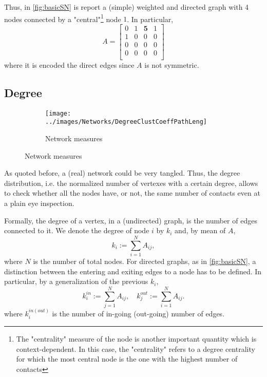 \documentclass[a4paper,10pt,twoside]{book} %
\theoremstyle{definition}
\begin{document}
Thus, in \autoref{fig:basicSN} is report a (simple) weighted and directed graph with 4 nodes connected by a "central"\footnote{The "centrality" measure of the node is another important quantity which is context-dependent. In this case, the "centrality" refers to a degree centrality for which the most central node is the one with the highest number of contacts} node $1$.
In particular,
\[
A = 
\begin{bmatrix}
0 & 1 & \textbf{5} & 1 \\
1 & 0 & 0 & 0 \\
0 & 0 & 0 & 0 \\
0 & 0 & 0 & 0 \\ 
\end{bmatrix}
\]
where it is encoded the direct edges since $A$ is not symmetric.

\subsection{Degree}

\begin{figure}[ht]
    \begin{subfigure}{\textwidth}
        \texttt{[image: ../images/Networks/DegreeClustCoeffPathLeng]}
        \centering
        \caption{Network measures \cite{Olaf:2011_NonRandomBrain}}
        \label{fig:degree_clustcoefficient_pathlength}
    \end{subfigure}
\end{figure}


As quoted before, a (real) network could be very tangled. Thus, the degree distribution, i.e. the normalized number of vertexes with a certain degree, allows to check whether all the nodes have, or not, the same number of contacts even at a plain eye inspection. 

Formally, the degree of a vertex, in a (undirected) graph, is the number of edges connected to it. We denote the degree of node $i$ by $k_i$ and, by mean of $A$, $$k_i := \sum_{i=1}^{N} A_{ij},$$ where $N$ is the number of total nodes.
For directed graphs, as in \autoref{fig:basicSN}, a distinction between the entering and exiting edges to a node has to be defined. In particular, by a generalization of the previous $k_i$, 
\begin{equation}
	k_i^{in} := \sum_{j=1}^N A_{ij}, \quad k_j^{out} := \sum_{i=1}^N A_{ij}.
	\label{eq:kin_kout}	
\end{equation}
where $k_i^{in(out)}$ is the number of in-going (out-going) number of edges. 
\end{document}

